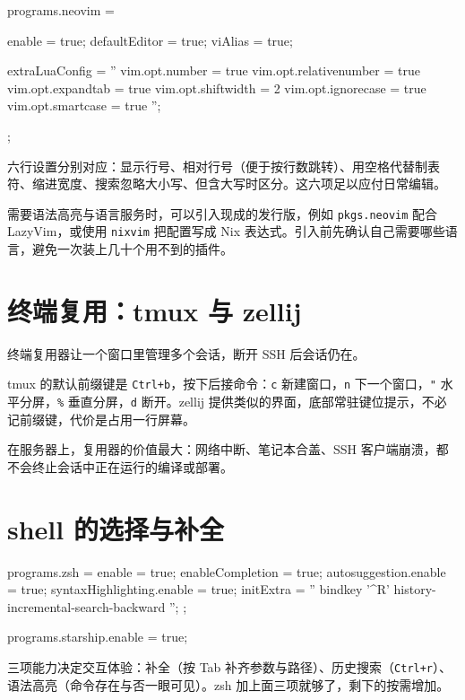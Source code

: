 \begin{nixcode}
programs.neovim = {
  enable = true;
  defaultEditor = true;
  viAlias = true;

  extraLuaConfig = ''
    vim.opt.number = true
    vim.opt.relativenumber = true
    vim.opt.expandtab = true
    vim.opt.shiftwidth = 2
    vim.opt.ignorecase = true
    vim.opt.smartcase = true
  '';
};
\end{nixcode}

六行设置分别对应：显示行号、相对行号（便于按行数跳转）、用空格代替制表符、缩进宽度、搜索忽略大小写、但含大写时区分。这六项足以应付日常编辑。

需要语法高亮与语言服务时，可以引入现成的发行版，例如 \texttt{pkgs.neovim} 配合 LazyVim，或使用 \texttt{nixvim} 把配置写成 Nix 表达式。引入前先确认自己需要哪些语言，避免一次装上几十个用不到的插件。

\section{终端复用：tmux 与 zellij}

终端复用器让一个窗口里管理多个会话，断开 SSH 后会话仍在。


tmux 的默认前缀键是 \texttt{Ctrl+b}，按下后接命令：\texttt{c} 新建窗口，\texttt{n} 下一个窗口，\texttt{"} 水平分屏，\texttt{\%} 垂直分屏，\texttt{d} 断开。zellij 提供类似的界面，底部常驻键位提示，不必记前缀键，代价是占用一行屏幕。

在服务器上，复用器的价值最大：网络中断、笔记本合盖、SSH 客户端崩溃，都不会终止会话中正在运行的编译或部署。

\section{shell 的选择与补全}

\begin{nixcode}
programs.zsh = {
  enable = true;
  enableCompletion = true;
  autosuggestion.enable = true;
  syntaxHighlighting.enable = true;
  initExtra = ''
    bindkey '^R' history-incremental-search-backward
  '';
};

programs.starship.enable = true;
\end{nixcode}

三项能力决定交互体验：补全（按 Tab 补齐参数与路径）、历史搜索（\texttt{Ctrl+r}）、语法高亮（命令存在与否一眼可见）。zsh 加上面三项就够了，剩下的按需增加。

